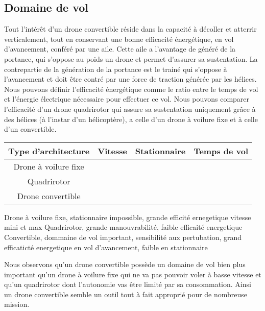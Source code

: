     \subsection{Domaine de vol} 
    Tout l'intérêt d'un drone convertible réside dans la capacité à décoller et atterrir verticalement, tout en conservant une bonne efficacité énergétique, en vol d'avancement, conféré par une aile. Cette aile a l'avantage de généré de la portance, qui s'oppose au poids un drone et permet d'assurer sa sustentation. La contrepartie de la génération de la portance est le trainé qui s'oppose à l'avancement et doit être contré par une force de traction générée par les hélices.
    Nous pouvons définir l'efficacité énergétique comme le ratio entre le temps de vol et l'énergie électrique nécessaire pour effectuer ce vol. Nous pouvons comparer l'efficacité d'un drone quadrirotor qui assure sa sustentation uniquement grâce à des hélices (à l'instar d'un hélicoptère), a celle d'un drone à voilure fixe et à celle d'un convertible.
    \begin{table}[ht]
        \centering
        \begin{tabular}{|c|c|c|c|}
            \hline
            Type d'architecture & Vitesse & Stationnaire & Temps de vol \\
            \hline \hline
            Drone à voilure fixe & & & \\
            \hline
            Quadrirotor & & & \\
            \hline
            Drone convertible & & & \\
            
        \end{tabular}
    \end{table}
    Drone à voilure fixe, stationnaire impossible, grande efficité ernegetique vitesse mini et max
    Quadrirotor, grande manouvrabilité, faible efficaité energetique
    Convertible, dommaine de vol important, sensibilité aux pertubation, grand efficaticté energetique en vol d'avancement, faible en stationnaire 

    Nous observons qu'un drone convertible possède un domaine de vol bien plus important qu'un drone à voilure fixe qui ne va pas pouvoir voler à basse vitesse et qu'un quadrirotor dont l'autonomie vas être limité par sa consommation. Ainsi un drone convertible semble un outil tout à fait approprié pour de nombreuse mission.

